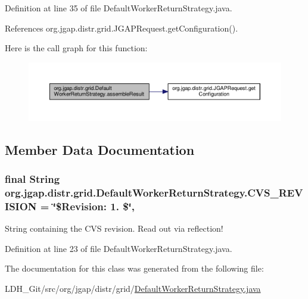 Definition at line 35 of file Default\-Worker\-Return\-Strategy.\-java.



References org.\-jgap.\-distr.\-grid.\-J\-G\-A\-P\-Request.\-get\-Configuration().



Here is the call graph for this function\-:
\nopagebreak
\begin{figure}[H]
\begin{center}
\leavevmode
\includegraphics[width=350pt]{classorg_1_1jgap_1_1distr_1_1grid_1_1_default_worker_return_strategy_ac5a447324c0bcd0f2915fb57b894f3c5_cgraph}
\end{center}
\end{figure}




\subsection{Member Data Documentation}
\hypertarget{classorg_1_1jgap_1_1distr_1_1grid_1_1_default_worker_return_strategy_a401dec374d5fcc23da53a850f3bc1700}{
\subsubsection[{C\-V\-S\-\_\-\-R\-E\-V\-I\-S\-I\-O\-N}]{\setlength{\rightskip}{0pt plus 5cm}final String org.\-jgap.\-distr.\-grid.\-Default\-Worker\-Return\-Strategy.\-C\-V\-S\-\_\-\-R\-E\-V\-I\-S\-I\-O\-N = \char`\"{}\$Revision\-: 1. \$\char`\"{}\hspace{0.3cm}{\ttfamily [static]}, {\ttfamily [private]}}}\label{classorg_1_1jgap_1_1distr_1_1grid_1_1_default_worker_return_strategy_a401dec374d5fcc23da53a850f3bc1700}
String containing the C\-V\-S revision. Read out via reflection! 

Definition at line 23 of file Default\-Worker\-Return\-Strategy.\-java.



The documentation for this class was generated from the following file\-:\begin{DoxyCompactItemize}
\item 
L\-D\-H\-\_\-\-Git/src/org/jgap/distr/grid/\hyperlink{_default_worker_return_strategy_8java}{Default\-Worker\-Return\-Strategy.\-java}\end{DoxyCompactItemize}
